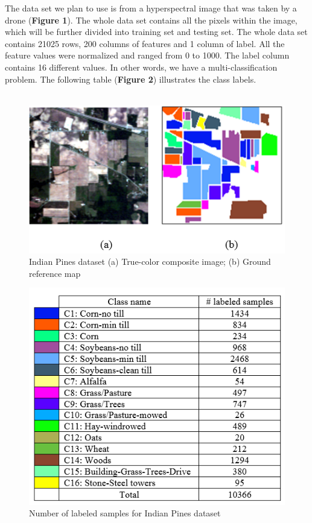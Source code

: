 \documentclass[11pt]{article}
\begin{document}
The data set we plan to use is from a hyperspectral image that was taken by a drone (\textbf{Figure 1}). The whole data set contains all the pixels within the image, which will be further divided into training set and testing set. The whole data set contains 21025 rows, 200 columns of features and 1 column of label. All the feature values were normalized and ranged from 0 to 1000. The label column contains 16 different values. In other words, we have a multi-classification problem. The following table (\textbf{Figure 2}) illustrates the class labels.\\ \\ 

\begin{figure}[ht]
\centering
\includegraphics[width=0.7\linewidth]{pic}
\caption{Indian Pines dataset (a) True-color composite image; (b) Ground reference map}
\label{fig:pic}
\end{figure}

\begin{figure}[ht]
\centering
\includegraphics[width=0.7\linewidth]{table}
\caption{Number of labeled samples for Indian Pines dataset}
\label{fig:table}
\end{figure}
\end{document}
